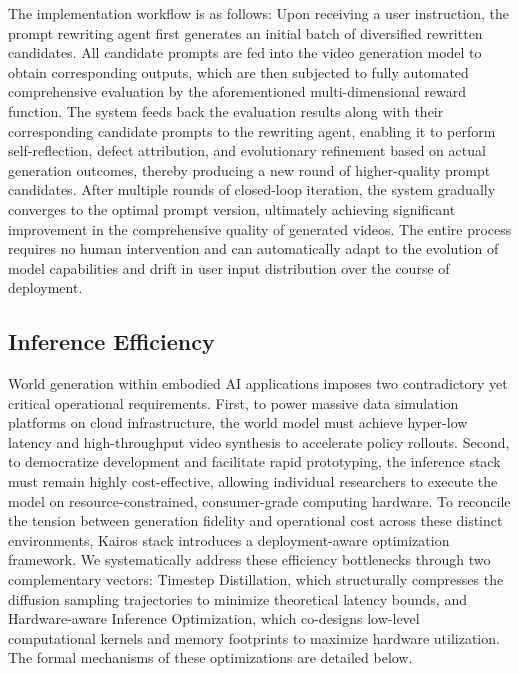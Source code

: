 The implementation workflow is as follows: Upon receiving a user instruction, the prompt rewriting agent first generates an initial batch of diversified rewritten candidates. All candidate prompts are fed into the video generation model to obtain corresponding outputs, which are then subjected to fully automated comprehensive evaluation by the aforementioned multi-dimensional reward function. The system feeds back the evaluation results along with their corresponding candidate prompts to the rewriting agent, enabling it to perform self-reflection, defect attribution, and evolutionary refinement based on actual generation outcomes, thereby producing a new round of higher-quality prompt candidates. After multiple rounds of closed-loop iteration, the system gradually converges to the optimal prompt version, ultimately achieving significant improvement in the comprehensive quality of generated videos. The entire process requires no human intervention and can automatically adapt to the evolution of model capabilities and drift in user input distribution over the course of deployment.




\subsection{Inference Efficiency}
World generation within embodied AI applications imposes two contradictory yet critical operational requirements. First, to power massive data simulation platforms on cloud infrastructure, the world model must achieve hyper-low latency and high-throughput video synthesis to accelerate policy rollouts. Second, to democratize development and facilitate rapid prototyping, the inference stack must remain highly cost-effective, allowing individual researchers to execute the model on resource-constrained, consumer-grade computing hardware. To reconcile the tension between generation fidelity and operational cost across these distinct environments, Kairos stack introduces a deployment-aware optimization framework. We systematically address these efficiency bottlenecks through two complementary vectors: Timestep Distillation, which structurally compresses the diffusion sampling trajectories to minimize theoretical latency bounds, and Hardware-aware Inference Optimization, which co-designs low-level computational kernels and memory footprints to maximize hardware utilization. The formal mechanisms of these optimizations are detailed below.



